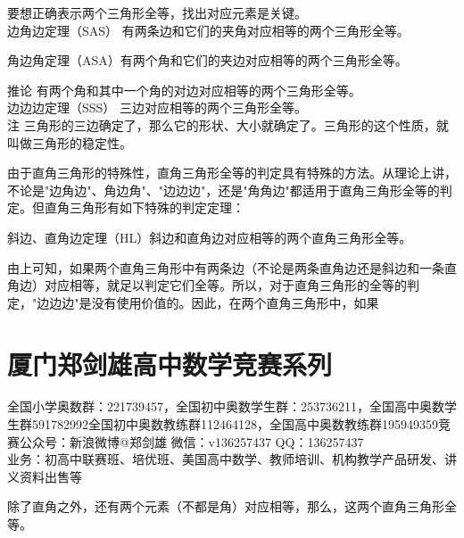 \documentclass[10pt]{article}
\begin{document}
要想正确表示两个三角形全等，找出对应元素是关键。\\
边角边定理（SAS） 有两条边和它们的夹角对应相等的两个三角形全等。

角边角定理（ASA）有两个角和它们的夹边对应相等的两个三角形全等。

推论 有两个角和其中一个角的对边对应相等的两个三角形全等。\\
边边边定理（SSS） 三边对应相等的两个三角形全等。\\
注 三角形的三边确定了，那么它的形状、大小就确定了。三角形的这个性质，就叫做三角形的稳定性。

由于直角三角形的特殊性，直角三角形全等的判定具有特殊的方法。从理论上讲，不论是"边角边"、角边角"、"边边边"，还是"角角边"都适用于直角三角形全等的判定。但直角三角形有如下特殊的判定定理：

斜边、直角边定理（HL）斜边和直角边对应相等的两个直角三角形全等。

由上可知，如果两个直角三角形中有两条边（不论是两条直角边还是斜边和一条直角边）对应相等，就足以判定它们全等。所以，对于直角三角形的全等的判定，"边边边"是没有使用价值的。因此，在两个直角三角形中，如果

\section*{厦门郑剑雄高中数学竞赛系列}
全国小学奥数群：221739457，全国初中奥数学生群：253736211，全国高中奥数学生群591782992全国初中奥数教练群112464128，全国高中奥数教练群195949359竞赛公众号：新浪微博@郑剑雄 微信：v136257437 QQ：136257437\\
业务：初高中联赛班、培优班、美国高中数学、教师培训、机构教学产品研发、讲义资料出售等

除了直角之外，还有两个元素（不都是角）对应相等，那么，这两个直角三角形全等。
\end{document}
